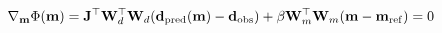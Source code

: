 \begin{equation}
\label{eq:richards-objective-deriv}
\nabla_{\mathbf{m}} \Phi ( \mathbf{m} ) =  \mathbf{J}^\top \mathbf{W}_d^\top \mathbf{W}_d(\mathbf{d}_{\rm pred}(\mathbf{m}) - \mathbf{d}_{\rm obs})+\beta \mathbf{W}_m^\top \mathbf{W}_m(\mathbf{m}-\mathbf{m}_{\rm ref})= 0
\end{equation}
